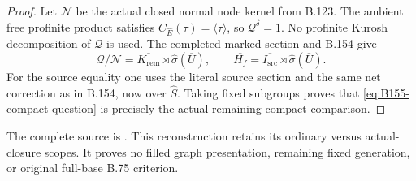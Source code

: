 \begin{proof}
Let $\mathcal N$ be the actual closed normal node kernel from B.123.
The ambient free profinite product satisfies
$C_{\widehat E}(\tau)=\langle\tau\rangle$, so
$\mathcal Q^\delta=1$. No profinite Kurosh decomposition of
$\mathcal Q$ is used. The completed marked section and B.154 give
\[
 \mathcal Q/\mathcal N
   =\overline{K_{\mathrm{rem}}}\rtimes\widehat\sigma(\overline U),
 \qquad
 \overline{H_f}
   =\overline{I_{\mathrm{src}}}\rtimes\widehat\sigma(\overline U).
 \]
For the source equality one uses the literal source section and the
same net correction as in B.154, now over $\widehat S$. Taking fixed
subgroups proves that \eqref{eq:B155-compact-question} is precisely the
actual remaining compact comparison.
\end{proof}
The complete source is
.
This reconstruction retains its ordinary versus actual-closure scopes.
It proves no filled graph presentation, remaining fixed generation,
or original full-base B.75 criterion.
